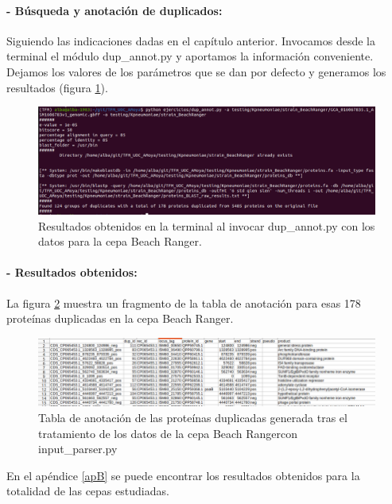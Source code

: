 \paragraph{\textbf{- Búsqueda y anotación de duplicados: }} Siguiendo las indicaciones dadas en el capítulo anterior. Invocamos desde la terminal el módulo dup\_annot.py y aportamos la información conveniente. Dejamos los valores de los parámetros que se dan por defecto y generamos los resultados (figura \ref{fig:ex_beach}).

\begin{figure}[h]
	\centering
	\captionsetup{width=0.7\linewidth} 
	\includegraphics[width=0.7\linewidth]{figs/ex_beach.png}
	\caption[Ejemplo de uso en la cepa Beach Ranger]{Resultados obtenidos en la terminal al invocar dup\_annot.py con los datos para la cepa Beach Ranger.}
	\label{fig:ex_beach}
\end{figure}

\newpage
\paragraph{\textbf{- Resultados obtenidos: }} La figura \ref{fig:beach_result} muestra un fragmento de la tabla de anotación para esas 178 proteínas duplicadas en la cepa Beach Ranger.

\begin{figure}[h]
	\centering
	\captionsetup{width=\linewidth} 
	\includegraphics[width=\linewidth]{figs/beach_result.png}
	\caption[Tabla de anotación del genoma duplicado de la cepa Beach Ranger]{Tabla de anotación de las proteínas duplicadas generada tras el tratamiento de los datos de la cepa Beach Rangercon input\_parser.py}
	\label{fig:beach_result}
\end{figure}

En el apéndice \ref{apB} se puede encontrar los resultados obtenidos para la totalidad de las cepas estudiadas.

